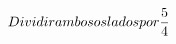 \documentclass[preview]{standalone}
\begin{document}
\begin{align*}
\special{dvisvgm:raw <g id='unique000'>}Dividir ambos os lados por \frac{5}{4}\special{dvisvgm:raw </g>}
\end{align*}
\end{document}

